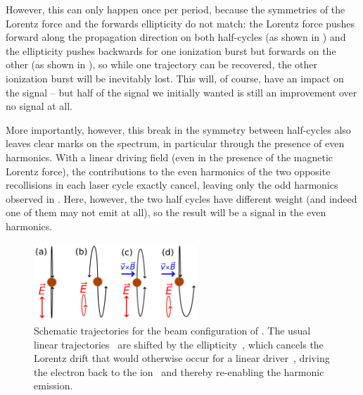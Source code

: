 However, this can only happen once per period, because the symmetries of the Lorentz force and the forwards ellipticity do not match: the Lorentz force pushes forward along the propagation direction on both half-cycles (as shown in ) and the ellipticity pushes backwards for one ionization burst but forwards on the other (as shown in ), so while one trajectory can be recovered, the other ionization burst will be inevitably lost. This will, of course, have an impact on the signal -- but half of the signal we initially wanted is still an improvement over no signal at all.




More importantly, however, this break in the symmetry between half-cycles also leaves clear marks on the spectrum, in particular through the presence of even harmonics. With a linear driving field (even in the presence of the magnetic Lorentz force), the contributions to the even harmonics of the two opposite recollisions in each laser cycle exactly cancel, leaving only the odd harmonics observed in . Here, however, the two half cycles have different weight (and indeed one of them may not emit at all), so the result will be a signal in the even harmonics. 


\begin{figure}[t!]
  \centering
  \subfigure{\label{f8-schematic-trajectories-a}}
  \subfigure{\label{f8-schematic-trajectories-b}}
  \subfigure{\label{f8-schematic-trajectories-c}}
  \subfigure{\label{f8-schematic-trajectories-d}}
  \includegraphics[width=0.55\textwidth]{9-Nondipole-HHG/Figures/figure9C.png} 
  \caption[
  Schematic electron trajectories in a forwards-elliptical field, with the effect of the ellipticity, the Lorentz force, and their combination
  ]{
  Schematic trajectories for the beam configuration of . The usual linear trajectories~\protect{} are shifted by the ellipticity~\protect{}, which cancels the Lorentz drift that would otherwise occur for a linear driver~\protect{}, driving the electron back to the ion~\protect{} and thereby re-enabling the harmonic emission.
  }
\label{f8-schematic-trajectories}
\end{figure}



